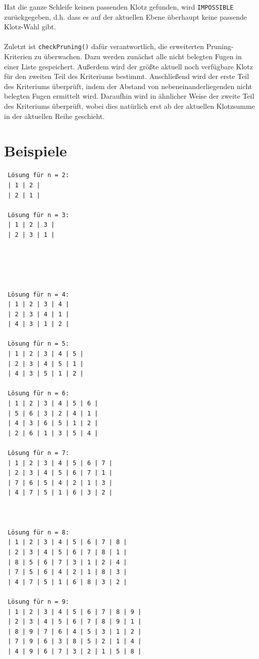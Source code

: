 \documentclass[a4paper, notitlepage, 12pt]{scrartcl}
\begin{document}
Hat die ganze Schleife keinen passenden Klotz gefunden, wird \texttt{IMPOSSIBLE} zurückgegeben, d.h. dass es auf der aktuellen Ebene überhaupt keine passende Klotz-Wahl gibt.
\\ \\
Zuletzt ist \texttt{checkPruning()} dafür verantwortlich, die erweiterten Pruning-Kriterien zu überwachen. Dazu werden zunächst alle nicht belegten Fugen in einer Liste gespeichert. Außerdem wird der größte aktuell noch verfügbare Klotz für den zweiten Teil des Kriteriums bestimmt. Anschließend wird der erste Teil des Kriteriums überprüft, indem der Abstand von nebeneinanderliegenden nicht belegten Fugen ermittelt wird. Daraufhin wird in ähnlicher Weise der zweite Teil des Kriteriums überprüft, wobei dies natürlich erst ab der aktuellen Klotzsumme in der aktuellen Reihe geschieht.
\section{Beispiele}
 \begin{multicols}{2}
 \begin{verbatim}
 Lösung für n = 2: 
 | 1 | 2 | 
 | 2 | 1 |
 
 Lösung für n = 3:
 | 1 | 2 | 3 | 
 | 2 | 3 | 1 |
 
 
 
 
 
 Lösung für n = 4: 
 | 1 | 2 | 3 | 4 | 
 | 2 | 3 | 4 | 1 | 
 | 4 | 3 | 1 | 2 |
 
 Lösung für n = 5: 
 | 1 | 2 | 3 | 4 | 5 | 
 | 2 | 3 | 4 | 5 | 1 | 
 | 4 | 3 | 5 | 1 | 2 |
 
 Lösung für n = 6: 
 | 1 | 2 | 3 | 4 | 5 | 6 | 
 | 5 | 6 | 3 | 2 | 4 | 1 | 
 | 4 | 3 | 6 | 5 | 1 | 2 | 
 | 2 | 6 | 1 | 3 | 5 | 4 |
 
 Lösung für n = 7:
 | 1 | 2 | 3 | 4 | 5 | 6 | 7 | 
 | 2 | 3 | 4 | 5 | 6 | 7 | 1 | 
 | 7 | 6 | 5 | 4 | 2 | 1 | 3 | 
 | 4 | 7 | 5 | 1 | 6 | 3 | 2 | 



 Lösung für n = 8:
 | 1 | 2 | 3 | 4 | 5 | 6 | 7 | 8 | 
 | 2 | 3 | 4 | 5 | 6 | 7 | 8 | 1 | 
 | 8 | 5 | 6 | 7 | 3 | 1 | 2 | 4 | 
 | 7 | 5 | 6 | 4 | 2 | 1 | 8 | 3 | 
 | 4 | 7 | 5 | 1 | 6 | 8 | 3 | 2 | 
 
 Lösung für n = 9:
 | 1 | 2 | 3 | 4 | 5 | 6 | 7 | 8 | 9 | 
 | 2 | 3 | 4 | 5 | 6 | 7 | 8 | 9 | 1 | 
 | 8 | 9 | 7 | 6 | 4 | 5 | 3 | 1 | 2 | 
 | 7 | 9 | 6 | 3 | 8 | 5 | 2 | 1 | 4 | 
 | 4 | 9 | 6 | 7 | 3 | 2 | 1 | 5 | 8 | 
  \end{verbatim}
 \end{multicols}
\end{document}
